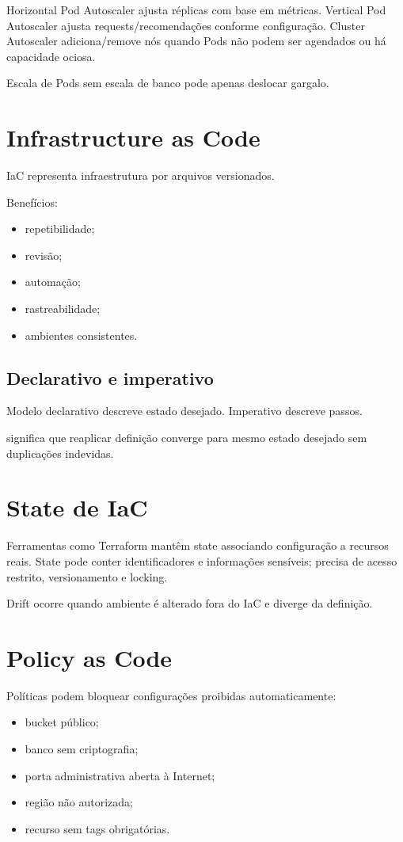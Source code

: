 Horizontal Pod Autoscaler ajusta réplicas com base em métricas. Vertical Pod Autoscaler ajusta requests/recomendações conforme configuração. Cluster Autoscaler adiciona/remove nós quando Pods não podem ser agendados ou há capacidade ociosa.

Escala de Pods sem escala de banco pode apenas deslocar gargalo.

\section{Infrastructure as Code}

IaC representa infraestrutura por arquivos versionados.

Benefícios:
\begin{itemize}
\item repetibilidade;
\item revisão;
\item automação;
\item rastreabilidade;
\item ambientes consistentes.
\end{itemize}

\subsection{Declarativo e imperativo}

Modelo declarativo descreve estado desejado. Imperativo descreve passos.

 significa que reaplicar definição converge para mesmo estado desejado sem duplicações indevidas.

\section{State de IaC}

Ferramentas como Terraform mantêm state associando configuração a recursos reais. State pode conter identificadores e informações sensíveis; precisa de acesso restrito, versionamento e locking.

Drift ocorre quando ambiente é alterado fora do IaC e diverge da definição.

\section{Policy as Code}

Políticas podem bloquear configurações proibidas automaticamente:
\begin{itemize}
\item bucket público;
\item banco sem criptografia;
\item porta administrativa aberta à Internet;
\item região não autorizada;
\item recurso sem tags obrigatórias.
\end{itemize}

